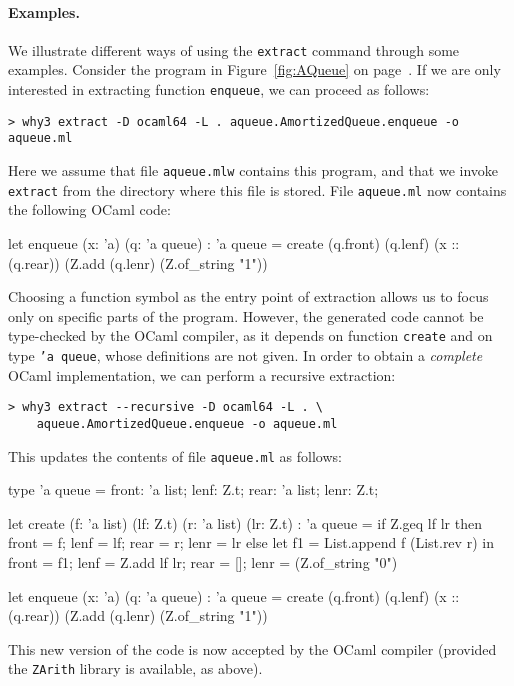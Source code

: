 \paragraph{Examples.}
We illustrate different ways of using the \texttt{extract} command through some
examples. Consider the program in Figure~\ref{fig:AQueue} on
page~\pageref{fig:AQueue}. If we are only interested in extracting function
\texttt{enqueue}, we can proceed as follows:
\begin{verbatim}
> why3 extract -D ocaml64 -L . aqueue.AmortizedQueue.enqueue -o aqueue.ml
\end{verbatim}
Here we assume that file \texttt{aqueue.mlw} contains this program, and that
we invoke \texttt{extract} from the directory where this file is stored. File
\texttt{aqueue.ml} now contains the following OCaml code:
\begin{whycode}
let enqueue (x: 'a) (q: 'a queue) : 'a queue =
  create (q.front) (q.lenf) (x :: (q.rear))
    (Z.add (q.lenr) (Z.of_string "1"))
\end{whycode}
Choosing a function symbol as the entry point of extraction allows us to focus
only on specific parts of the program. However, the generated code cannot be
type-checked by the OCaml compiler, as it depends on function \texttt{create}
and on type \texttt{'a queue}, whose definitions are not given. In order to
obtain a \emph{complete} OCaml implementation, we can perform a recursive
extraction:
\begin{verbatim}
> why3 extract --recursive -D ocaml64 -L . \
    aqueue.AmortizedQueue.enqueue -o aqueue.ml
\end{verbatim}
This updates the contents of file \texttt{aqueue.ml} as follows:
\begin{whycode}
type 'a queue = {
  front: 'a list;
  lenf: Z.t;
  rear: 'a list;
  lenr: Z.t;
  }

let create (f: 'a list) (lf: Z.t) (r: 'a list) (lr: Z.t) : 'a queue =
  if Z.geq lf lr
  then
    { front = f; lenf = lf; rear = r; lenr = lr }
  else
    let f1 = List.append f (List.rev r) in
    { front = f1; lenf = Z.add lf lr; rear = []; lenr = (Z.of_string "0") }

let enqueue (x: 'a) (q: 'a queue) : 'a queue =
  create (q.front) (q.lenf) (x :: (q.rear))
    (Z.add (q.lenr) (Z.of_string "1"))
\end{whycode}
This new version of the code is now accepted by the OCaml compiler
(provided the \texttt{ZArith} library is available, as above).

